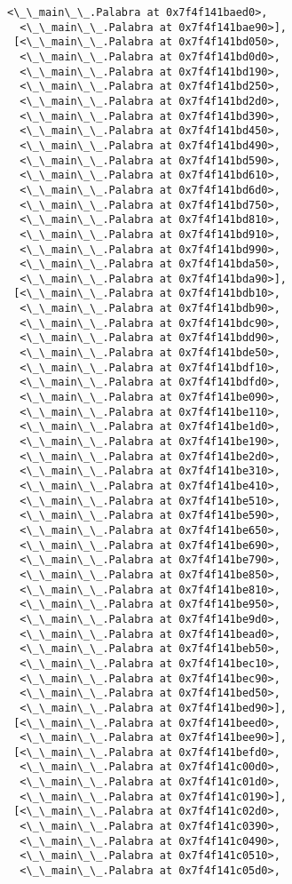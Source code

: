 \documentclass[12pt,a4paper,table]{article}
\begin{document}
\begin{tcolorbox}[breakable, size=fbox, boxrule=.5pt, pad at break*=1mm, opacityfill=0]
\begin{Verbatim}[commandchars=\\\{\}]
  <\_\_main\_\_.Palabra at 0x7f4f141baed0>,
  <\_\_main\_\_.Palabra at 0x7f4f141bae90>],
 [<\_\_main\_\_.Palabra at 0x7f4f141bd050>,
  <\_\_main\_\_.Palabra at 0x7f4f141bd0d0>,
  <\_\_main\_\_.Palabra at 0x7f4f141bd190>,
  <\_\_main\_\_.Palabra at 0x7f4f141bd250>,
  <\_\_main\_\_.Palabra at 0x7f4f141bd2d0>,
  <\_\_main\_\_.Palabra at 0x7f4f141bd390>,
  <\_\_main\_\_.Palabra at 0x7f4f141bd450>,
  <\_\_main\_\_.Palabra at 0x7f4f141bd490>,
  <\_\_main\_\_.Palabra at 0x7f4f141bd590>,
  <\_\_main\_\_.Palabra at 0x7f4f141bd610>,
  <\_\_main\_\_.Palabra at 0x7f4f141bd6d0>,
  <\_\_main\_\_.Palabra at 0x7f4f141bd750>,
  <\_\_main\_\_.Palabra at 0x7f4f141bd810>,
  <\_\_main\_\_.Palabra at 0x7f4f141bd910>,
  <\_\_main\_\_.Palabra at 0x7f4f141bd990>,
  <\_\_main\_\_.Palabra at 0x7f4f141bda50>,
  <\_\_main\_\_.Palabra at 0x7f4f141bda90>],
 [<\_\_main\_\_.Palabra at 0x7f4f141bdb10>,
  <\_\_main\_\_.Palabra at 0x7f4f141bdb90>,
  <\_\_main\_\_.Palabra at 0x7f4f141bdc90>,
  <\_\_main\_\_.Palabra at 0x7f4f141bdd90>,
  <\_\_main\_\_.Palabra at 0x7f4f141bde50>,
  <\_\_main\_\_.Palabra at 0x7f4f141bdf10>,
  <\_\_main\_\_.Palabra at 0x7f4f141bdfd0>,
  <\_\_main\_\_.Palabra at 0x7f4f141be090>,
  <\_\_main\_\_.Palabra at 0x7f4f141be110>,
  <\_\_main\_\_.Palabra at 0x7f4f141be1d0>,
  <\_\_main\_\_.Palabra at 0x7f4f141be190>,
  <\_\_main\_\_.Palabra at 0x7f4f141be2d0>,
  <\_\_main\_\_.Palabra at 0x7f4f141be310>,
  <\_\_main\_\_.Palabra at 0x7f4f141be410>,
  <\_\_main\_\_.Palabra at 0x7f4f141be510>,
  <\_\_main\_\_.Palabra at 0x7f4f141be590>,
  <\_\_main\_\_.Palabra at 0x7f4f141be650>,
  <\_\_main\_\_.Palabra at 0x7f4f141be690>,
  <\_\_main\_\_.Palabra at 0x7f4f141be790>,
  <\_\_main\_\_.Palabra at 0x7f4f141be850>,
  <\_\_main\_\_.Palabra at 0x7f4f141be810>,
  <\_\_main\_\_.Palabra at 0x7f4f141be950>,
  <\_\_main\_\_.Palabra at 0x7f4f141be9d0>,
  <\_\_main\_\_.Palabra at 0x7f4f141bead0>,
  <\_\_main\_\_.Palabra at 0x7f4f141beb50>,
  <\_\_main\_\_.Palabra at 0x7f4f141bec10>,
  <\_\_main\_\_.Palabra at 0x7f4f141bec90>,
  <\_\_main\_\_.Palabra at 0x7f4f141bed50>,
  <\_\_main\_\_.Palabra at 0x7f4f141bed90>],
 [<\_\_main\_\_.Palabra at 0x7f4f141beed0>,
  <\_\_main\_\_.Palabra at 0x7f4f141bee90>],
 [<\_\_main\_\_.Palabra at 0x7f4f141befd0>,
  <\_\_main\_\_.Palabra at 0x7f4f141c00d0>,
  <\_\_main\_\_.Palabra at 0x7f4f141c01d0>,
  <\_\_main\_\_.Palabra at 0x7f4f141c0190>],
 [<\_\_main\_\_.Palabra at 0x7f4f141c02d0>,
  <\_\_main\_\_.Palabra at 0x7f4f141c0390>,
  <\_\_main\_\_.Palabra at 0x7f4f141c0490>,
  <\_\_main\_\_.Palabra at 0x7f4f141c0510>,
  <\_\_main\_\_.Palabra at 0x7f4f141c05d0>,

\end{Verbatim}
\end{tcolorbox}
\end{document}
